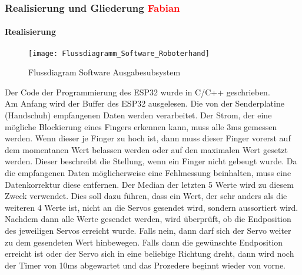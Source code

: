 \documentclass[titlepage,12pt,twoside]{article}
\begin{document}
\subsubsection{Realisierung und Gliederung \textcolor{red}{Fabian}}
\label{chap:Realisierung und Gleiderung Roboterhandsoftware}
\paragraph{Realisierung}
\hfill \break
\hfill \break
\begin{figure}[H]
	\begin{center}
		\scalebox{0.5}
		{\texttt{[image: Flussdiagramm\_Software\_Roboterhand]}}
		\caption{Flussdiagram Software Ausgabesubsystem}
		\label{fig:Flussdiagramm_Software_Roboterhand}		
	\end{center}
\end{figure}
\hfill \break
Der Code der Programmierung des ESP32 wurde in C/C++ geschrieben. \\
Am Anfang wird der Buffer des ESP32 ausgelesen. Die von der Senderplatine (Handschuh) empfangenen Daten werden verarbeitet. 
Der Strom, der eine mögliche Blockierung eines Fingers erkennen kann, muss alle 3ms gemessen werden. Wenn dieser je Finger zu 
hoch ist, dann muss dieser Finger vorerst auf dem momentanen Wert belassen werden oder auf den maximalen Wert gesetzt werden. 
Dieser beschreibt die Stellung, wenn ein Finger nicht gebeugt wurde. Da die empfangenen Daten möglicherweise eine Fehlmessung 
beinhalten, muss eine Datenkorrektur diese entfernen. Der Median der letzten 5 Werte wird zu diesem Zweck verwendet. Dies soll 
dazu führen, dass ein Wert, der sehr anders als die weiteren 4 Werte ist, nicht an die Servos gesendet wird, sondern aussortiert 
wird. Nachdem dann alle Werte gesendet werden, wird überprüft, ob die Endposition des jeweiligen Servos erreicht wurde. Falls 
nein, dann darf sich der Servo weiter zu dem gesendeten Wert hinbewegen. Falls dann die gewünschte Endposition erreicht ist 
oder der Servo sich in eine beliebige Richtung dreht, dann wird noch der Timer von 10ms abgewartet und das Prozedere beginnt 
wieder von vorne.
\\
\begin{figure}[H]
	\centering
\end{figure}
\begin{figure}[H]
	\centering
\end{figure}
\end{document}

